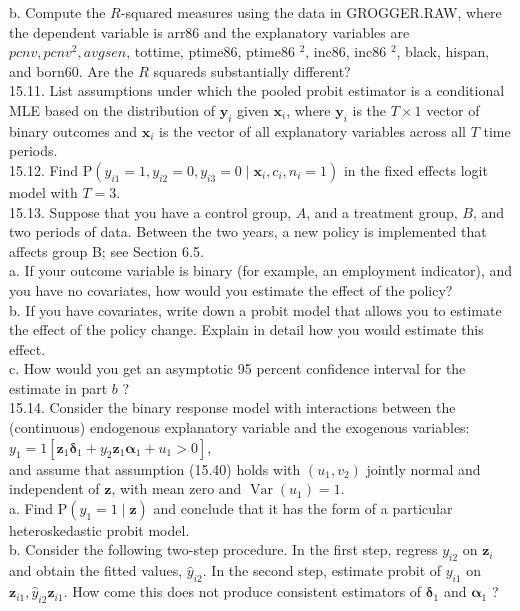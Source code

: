 \documentclass[10pt]{article}
\begin{document}
b. Compute the $R$-squared measures using the data in GROGGER.RAW, where the dependent variable is arr86 and the explanatory variables are $p c n v, p c n v^{2}, a v g s e n$, tottime, ptime86, ptime86 ${ }^{2}$, inc86, inc86 ${ }^{2}$, black, hispan, and born60. Are the $R$ squareds substantially different?\\
15.11. List assumptions under which the pooled probit estimator is a conditional MLE based on the distribution of $\mathbf{y}_{i}$ given $\mathbf{x}_{i}$, where $\mathbf{y}_{i}$ is the $T \times 1$ vector of binary outcomes and $\mathbf{x}_{i}$ is the vector of all explanatory variables across all $T$ time periods.\\
15.12. Find $\mathrm{P}\left(y_{i 1}=1, y_{i 2}=0, y_{i 3}=0 \mid \mathbf{x}_{i}, c_{i}, n_{i}=1\right)$ in the fixed effects logit model with $T=3$.\\
15.13. Suppose that you have a control group, $A$, and a treatment group, $B$, and two periods of data. Between the two years, a new policy is implemented that affects group B; see Section 6.5.\\
a. If your outcome variable is binary (for example, an employment indicator), and you have no covariates, how would you estimate the effect of the policy?\\
b. If you have covariates, write down a probit model that allows you to estimate the effect of the policy change. Explain in detail how you would estimate this effect.\\
c. How would you get an asymptotic 95 percent confidence interval for the estimate in part $b$ ?\\
15.14. Consider the binary response model with interactions between the (continuous) endogenous explanatory variable and the exogenous variables:\\
$y_{1}=1\left[\mathbf{z}_{1} \boldsymbol{\delta}_{1}+y_{2} \mathbf{z}_{1} \boldsymbol{\alpha}_{1}+u_{1}>0\right]$,\\
and assume that assumption (15.40) holds with $\left(u_{1}, v_{2}\right)$ jointly normal and independent of $\mathbf{z}$, with mean zero and $\operatorname{Var}\left(u_{1}\right)=1$.\\
a. Find $\mathrm{P}\left(y_{1}=1 \mid \mathbf{z}\right)$ and conclude that it has the form of a particular heteroskedastic probit model.\\
b. Consider the following two-step procedure. In the first step, regress $y_{i 2}$ on $\mathbf{z}_{i}$ and obtain the fitted values, $\hat{y}_{i 2}$. In the second step, estimate probit of $y_{i 1}$ on $\mathbf{z}_{i 1}, \hat{y}_{i 2} \mathbf{z}_{i 1}$. How come this does not produce consistent estimators of $\boldsymbol{\delta}_{1}$ and $\boldsymbol{\alpha}_{1}$ ?\\
\end{document}
